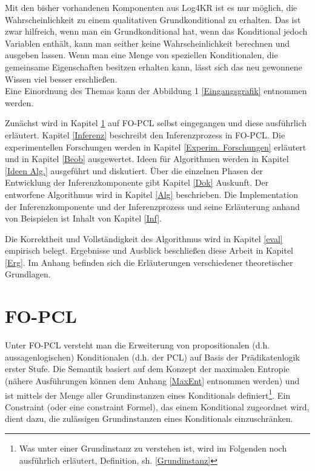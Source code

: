 \documentclass[a4paper, 11pt]{book}
\begin{document}
Mit den bisher vorhandenen Komponenten aus Log4KR ist es nur möglich, die Wahrscheinlichkeit zu einem qualitativen Grundkonditional zu erhalten. Das ist zwar hilfreich, wenn man ein Grundkonditional hat, wenn das Konditional jedoch Variablen enthält, kann man seither keine Wahrscheinlichkeit berechnen und ausgeben lassen.
Wenn man eine Menge von speziellen Konditionalen, die gemeinsame Eigenschaften besitzen erhalten kann, lässt sich das neu gewonnene Wissen viel besser erschließen. \\
Eine Einordnung des Themas kann der Abbildung 1 \ref{Eingangsgrafik} entnommen werden.


Zunächst wird in Kapitel \ref{FO-PCL} auf FO-PCL selbst eingegangen und diese ausführlich erläutert. Kapitel \ref{Inferenz} beschreibt den Inferenzprozess in FO-PCL. Die experimentellen Forschungen werden in Kapitel \ref{Experim. Forschungen} erläutert und in Kapitel \ref{Beob} ausgewertet. Ideen für Algorithmen werden in Kapitel \ref{Ideen Alg.} ausgeführt und diskutiert. Über die einzelnen Phasen der Entwicklung der Inferenzkomponente gibt Kapitel  \ref{Dok} Auskunft. Der entworfene Algorithmus wird in Kapitel \ref{Alg}  beschrieben. Die Implementation der Inferenzkomponente und der Inferenzprozess  und seine Erläuterung anhand von Beispielen ist Inhalt von Kapitel \ref{Inf}. 

 Die Korrektheit und Vollständigkeit des Algorithmus wird in Kapitel \ref{eval} empirisch belegt. Ergebnisse und Ausblick beschließen diese Arbeit in Kapitel \ref{Erg}. Im Anhang befinden sich die Erläuterungen verschiedener theoretischer Grundlagen.



\newpage

\chapter{FO-PCL}\label{FO-PCL} 
Unter FO-PCL versteht man die Erweiterung von propositionalen (d.h. aussagenlogischen) Konditionalen (d.h. der PCL) auf Basis der Prädikatenlogik erster Stufe. Die Semantik basiert auf dem Konzept der maximalen Entropie (nähere Ausführungen können dem Anhang \ref{MaxEnt} entnommen werden) und ist mittels der Menge aller Grundinstanzen eines Konditionals definiert\footnote{Was unter einer Grundinstanz zu verstehen ist, wird im Folgenden noch ausführlich erläutert, Definition, sh. \ref{Grundinstanz} }. Ein Constraint  (oder eine constraint Formel), das einem Konditional  zugeordnet wird, dient dazu,  die zulässigen Grundinstanzen eines Konditionals einzuschränken.
\end{document}
